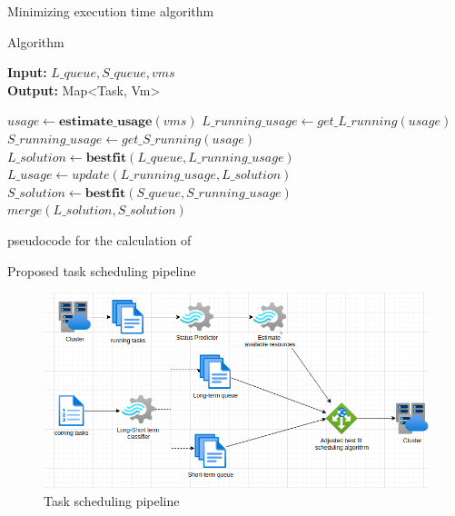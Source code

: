 \documentclass[10pt,xcolor={dvipsnames}, aspectratio=169]{beamer}
\begin{document}
\begin{frame}
{Minimizing execution time algorithm}
	\begin{block}
	{Algorithm}
		\begin{algorithm}[H]
		\textbf{Input:} $L\_queue, S\_queue, vms$ \\ 
    	\textbf{Output:} Map<Task, Vm>
		\begin{algorithmic}[1]
			\STATE $usage \leftarrow \textbf{estimate\_usage}(vms)$
			\STATE $L\_running\_usage \leftarrow get\_L\_running(usage)$
			\STATE $S\_running\_usage \leftarrow get\_S\_running(usage)$
			\STATE $L\_solution \leftarrow \textbf{bestfit}(L\_queue, L\_running\_usage)$
			\STATE $L\_usage \leftarrow update(L\_running\_usage, L\_solution)$
			\STATE $S\_solution \leftarrow \textbf{bestfit}(S\_queue, S\_running\_usage)$
			\RETURN $merge(L\_solution, S\_solution)$
		\end{algorithmic}
		\caption{pseudocode for the calculation of }
		\label{alg:seq}
		\end{algorithm}
	\end{block}
\end{frame}

\begin{frame}
{Proposed task scheduling pipeline}
	\begin{figure}
		\centering
		\includegraphics[scale=0.5]{images/scheduling_pipeline.png}
		\caption{Task scheduling pipeline}
	\end{figure}
\end{frame}
\end{document}

